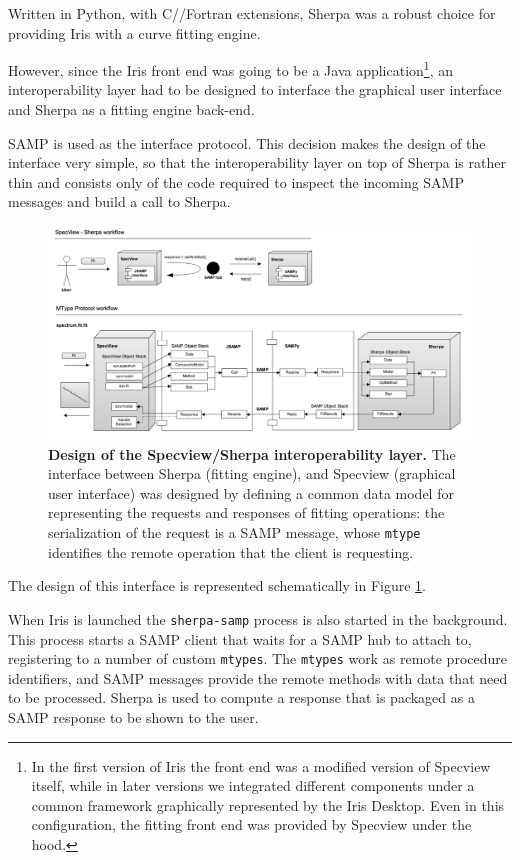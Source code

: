 \documentclass[preprint,authoryear,5p]{elsarticle}
\begin{document}
Written in Python, with C/\Cpp/Fortran extensions, Sherpa was a robust choice
for providing Iris with a curve fitting engine.

However, since the Iris front end was going to be a Java application\footnote{In
the first version of Iris the front end was a modified version of Specview
itself, while in later versions we integrated different components under a
common framework graphically represented by the Iris Desktop. Even in this
configuration, the fitting front end was provided by Specview under the hood.},
an interoperability layer had to be designed to interface the graphical user
interface and Sherpa as a fitting engine back-end.

SAMP is used as the interface protocol. This decision makes the design of the
interface very simple, so that the interoperability layer on top of Sherpa is
rather thin and consists only of the code required to inspect the incoming SAMP
messages and build a call to Sherpa.

\begin{figure} \begin{center}
\includegraphics[width=\textwidth]{sherpasamp.pdf}
\caption{\textbf{Design of the Specview/Sherpa interoperability layer.}  The
interface between Sherpa (fitting engine), and Specview (graphical user
interface) was designed by defining a common data model for representing the
requests and responses of fitting operations: the serialization of the request
is a SAMP message, whose \texttt{mtype} identifies the remote operation that the
client is requesting.} \label{fig:sherpasamp} \end{center} \end{figure}

The design of this interface is represented schematically in Figure
\ref{fig:sherpasamp}.

When Iris is launched the \verb|sherpa-samp| process is also started in the
background. This process starts a SAMP client that waits for a SAMP hub to
attach to, registering to a number of custom
\verb|mtypes|. The \verb|mtypes| work as remote procedure identifiers, and SAMP
messages provide the remote methods with data that need to be processed. Sherpa
is used to compute a response that is packaged as a
SAMP response to be shown to the user.
\end{document}
